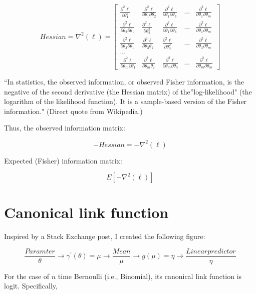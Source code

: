 \documentclass[]{book}
\begin{document}
\[Hessian=\nabla ^2(\ell) =\begin{bmatrix}
\frac{\partial^2 \ell}{\partial \theta_1^2} & \frac{\partial^2 \ell}{\partial \theta_1 \partial \theta_2} & \frac{\partial^2 \ell}{\partial \theta_1 \partial \theta_3} & ... & \frac{\partial^2 \ell}{\partial \theta_1 \partial \theta_m}\\
\frac{\partial^2 \ell}{\partial \theta_2 \partial \theta_1} & \frac{\partial^2 \ell}{\partial \theta_2^2 } & \frac{\partial^2 \ell}{\partial \theta_1 \partial \theta_3} & ... & \frac{\partial^2 \ell}{\partial \theta_1 \partial \theta_m} \\
\frac{\partial^2 \ell}{\partial \theta_3 \partial \theta_1} & \frac{\partial^2 \ell}{\partial \theta_3 \theta_2 } & \frac{\partial^2 \ell}{\partial \theta_3^2} & ... & \frac{\partial^2 \ell}{\partial \theta_3 \partial \theta_m} \\
...\\
\frac{\partial^2 \ell}{\partial \theta_m \partial \theta_1} & \frac{\partial^2 \ell}{\partial \theta_m \theta_2 } & \frac{\partial^2 \ell}{\partial \theta_m \partial \theta_3} & ... & \frac{\partial^2 \ell}{\partial \theta_m \partial \theta_m} 
\end{bmatrix}\]

``In statistics, the observed information, or observed Fisher information, is the negative of the second derivative (the Hessian matrix) of the''log-likelihood" (the logarithm of the likelihood function). It is a sample-based version of the Fisher information." (Direct quote from Wikipedia.)

Thus, the observed information matrix:

\[-Hessian=-\nabla ^2(\ell) \]

Expected (Fisher) information matrix:

\[E[-\nabla ^2(\ell)] \]

\hypertarget{canonical-link-function}{%
\section{Canonical link function}\label{canonical-link-function}}

Inspired by a Stack Exchange post, I created the following figure:

\[ \frac{Paramter}{\theta} \longrightarrow \gamma^{'}(\theta) = \mu \longrightarrow \frac{Mean}{\mu} \longrightarrow g(\mu) = \eta \longrightarrow \frac{ Linear predictor}{\eta} \]

For the case of \(n\) time Bernoulli (i.e., Binomial), its canonical link function is logit. Specifically,
\end{document}
